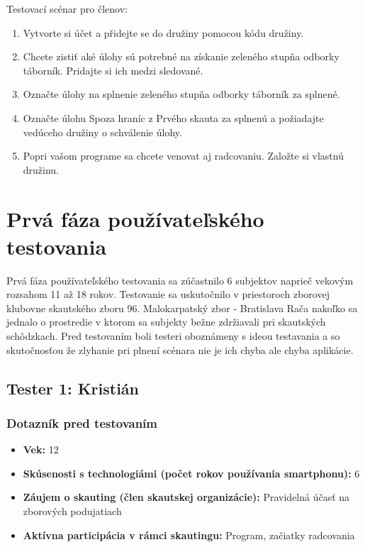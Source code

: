Testovací scénar pro členov:
\begin{enumerate}
    \item Vytvorte si účet a přidejte se do družiny pomocou kódu družiny.
    \item Chcete zistiť aké úlohy sú potrebné na získanie zeleného stupňa odborky táborník. Pridajte si ich medzi sledované.
    \item Označte úlohy na splnenie zeleného stupňa odborky táborník za splnené.
    \item Označte úlohu Spoza hraníc z Prvého skauta za splnenú a požiadajte vedúceho družiny o schválenie úlohy.
    \item Popri vašom programe sa chcete venovat aj radcovaniu. Založte si vlastnú družinu.
\end{enumerate}

\section{Prvá fáza používateľského testovania}
Prvá fáza používateľského testovania sa zúčastnilo 6 subjektov naprieč vekovým rozsahom 11 až 18 rokov. Testovanie sa uskutočnilo v priestoroch zborovej klubovne skautského zboru 96. Malokarpatský zbor - Bratislava Rača nakoľko sa jednalo o prostredie v ktorom sa subjekty bežne zdržiavali pri skautských schôdzkach. Pred testovaním boli testeri oboznámeny s ideou testavania a so skutočnosťou že zlyhanie pri plnení scénara nie je ich chyba ale chyba aplikácie.

\subsection*{Tester 1: Kristián}
\subsubsection*{Dotazník pred testovaním}
\begin{itemize}[leftmargin=*]
    \item \textbf{Vek:} 12
    \item \textbf{Skúsenosti s technologiámi (počet rokov používania smartphonu):} 6
    \item \textbf{Záujem o skauting (člen skautskej organizácie):} Pravidelná účasť na zborových podujatiach
    \item \textbf{Aktívna participácia v rámci skautingu:} Program, začiatky radcovania
\end{itemize}

